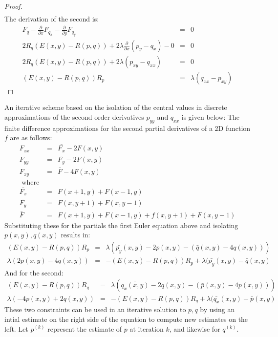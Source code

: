 \documentclass[letter,11pt]{article}
\begin{document}
{{\begin{proof}
\begin{eqnarray*}
\end{eqnarray*}
The derivation of the second is:
\begin{eqnarray*}
    F_q - \frac{\partial}{\partial x}F_{q_x}-\frac{\partial}{\partial y}F_{q_y} &=& 0 \\
	2R_q(E(x,y)-R(p,q)) + 2\lambda\frac{\partial}{\partial x}(p_y-q_x) - 0 &=& 0 \\
    2R_q(E(x,y)-R(p,q)) + 2\lambda(p_{xy}-q_{xx}) &=& 0 \\
    (E(x,y)-R(p,q))R_p &=& \lambda(q_{xx}-p_{xy})
\end{eqnarray*}
\end{proof}
}
{
An iterative scheme based on the isolation of the central values in discrete approximations of the second order derivatives $p_{yy}$ and $q_{xx}$ is given below:
The finite difference approximations for the second partial derivatives of a 2D function $f$ are as follows:
\begin{eqnarray*}
	F_{xx} &=& \bar{F_x}-2F(x,y) \\ 
	F_{yy} &=& \bar{F_y}-2F(x,y) \\
	F_{xy} &=& \bar{F}-4F(x,y) \\
	\textrm{ where } & &\\
	\bar{F_x}&=&F(x+1,y)+F(x-1,y) \\
	\bar{F_y}&=&F(x,y+1)+F(x,y-1) \\
	\bar{F}&=&F(x+1,y)+F(x-1,y)+f(x,y+1)+F(x,y-1)
\end{eqnarray*}
Substituting these for the partials the first Euler equation above and isolating $p(x,y),q(x,y)$ results in:
\begin{eqnarray*}
	(E(x,y)-R(p,q))R_p &=& 
		\lambda ( \bar{p_y}(x,y) - 2p(x,y) - \left( \bar{q}(x,y) - 4q(x,y)\right))\\
	\lambda\left( 2p(x,y) - 4q(x,y)\right) &=& 
		-(E(x,y)-R(p,q))R_p + \lambda ( \bar{p_y}(x,y) - \bar{q}(x,y)
\end{eqnarray*}
And for the second:
\begin{eqnarray*}
	(E(x,y)-R(p,q))R_q &=&
		\lambda ( \bar{q_x(x,y)} - 2q(x,y)  - \left( \bar{p}(x,y) - 4p(x,y)\right))\\
	\lambda\left( -4p(x,y) + 2q(x,y)\right) &=&
		-(E(x,y)-R(p,q))R_q + \lambda ( \bar{q_x}(x,y) - \bar{p}(x,y)  
\end{eqnarray*}
These two constraints can be used in an iterative solution to $p,q$ by using an intial estimate on the right side of the equation to compute new estimates on the left.  Let $p^{(k)}$ represent the estimate of $p$ at iteration $k$, and likewise for $q^{(k)}$. 
}}
\end{document}
